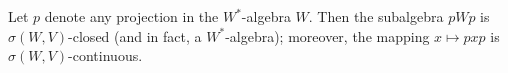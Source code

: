 Let $p$ denote any projection in the $W^*$-algebra $W$. Then the subalgebra $pWp$ is $\sigma(W, V)$-closed (and in fact, a $W^*$-algebra); moreover, the mapping $x \mapsto pxp$ is $\sigma(W, V)$-continuous.
